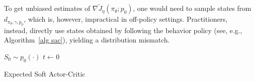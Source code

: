 \documentclass[twoside,11pt]{article}
\numberwithin{assucounter}{section}
\begin{document}
To get unbiased estimates of $\nabla \tilde J_\eta(\pi_\theta; p_0)$,
one would need to sample states from $d_{\pi_\theta, \gamma, p_0}$,
which is, however,
impractical in off-policy settings.
Practitioners, instead,
directly use states obtained by following the behavior policy (see, e.g., Algorithm~\ref{alg sac}),
yielding a distribution mismatch.
\begin{algorithm}
  $S_0 \sim p_0(\cdot)$ \;
  $t \gets 0$ \;
  \caption{\label{alg sac} Expected Soft Actor-Critic}
\end{algorithm}
\end{document}
